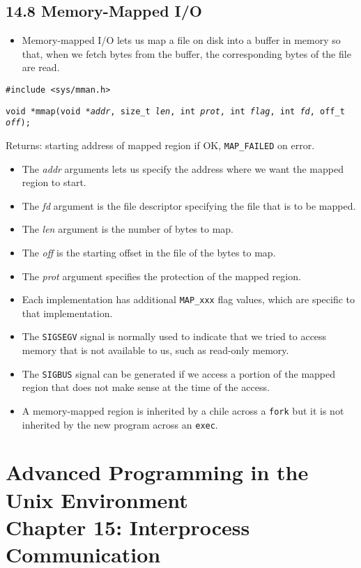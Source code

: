 \documentclass[]{article}
\newcommand{\code}{\texttt}
\begin{document}
\subsection*{14.8 Memory-Mapped I/O}
\begin{itemize}
\item Memory-mapped I/O lets us map a file on disk into a buffer in memory so
that, when we fetch bytes from the buffer, the corresponding bytes of the file
are read.
\end{itemize}

\code{\#include <sys/mman.h>}

\code{void *mmap(void *\emph{addr}, size\_t \emph{len}, int \emph{prot}, int
\emph{flag}, int \emph{fd}, off\_t \emph{off});}

Returns: starting address of mapped region if OK, \code{MAP\_FAILED} on error.

\begin{itemize}
\item The \emph{addr} arguments lets us specify the address where we want the
mapped region to start.
\item The \emph{fd} argument is the file descriptor specifying the file that is
to be mapped.
\item The \emph{len} argument  is the number of bytes to map.
\item The \emph{off} is the starting offset in the file of the bytes to map.
\item The \emph{prot} argument specifies the protection of the mapped region.
\item Each implementation has additional \code{MAP\_xxx} flag values, which are
specific to that implementation.
\item The \code{SIGSEGV} signal is normally used to indicate that we tried to
access memory that is not available to us, such as read-only memory.
\item The \code{SIGBUS} signal can be generated if we access a portion of the
mapped region that does not make sense at the time of the access.
\item A memory-mapped region is inherited by a chile across a \code{fork} but it
is not inherited by the new program across an \code{exec}.
\end{itemize}


\section*{Advanced Programming in the Unix Environment \\
Chapter 15: Interprocess Communication}
\end{document}
